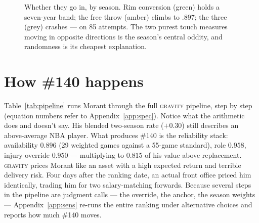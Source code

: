 \documentclass[11pt]{article}
\newcommand{\gravity}{\textsc{gravity}}
\begin{document}
\begin{figure}[h]
\centering
{}
\caption{Whether they go in, by season. Rim conversion (green) holds a seven-year band;
the free throw (amber) climbs to .897; the three (grey) crashes --- on 85 attempts. The two
purest touch measures moving in opposite directions is the season's central oddity, and
randomness is its cheapest explanation.}
\label{fig:acc}
\end{figure}

\section{How \#140 happens}
\label{sec:value}

Table~\ref{tab:pipeline} runs Morant through the full \gravity{} pipeline, step by step
(equation numbers refer to Appendix~\ref{app:spec}). Notice what the arithmetic does and
doesn't say. His blended two-season rate ($+0.30$) still describes an above-average NBA
player. What produces \#140 is the reliability stack: availability $0.896$ (29 weighted
games against a 55-game standard), role $0.958$, injury override $0.950$ --- multiplying
to $0.815$ of his value above replacement. \gravity{} prices Morant like an asset with a
high expected return and terrible delivery risk. Four days after the ranking date, an
actual front office priced him identically, trading him for two salary-matching forwards.
Because several steps in the pipeline are judgment calls --- the override, the anchor,
the season weights --- Appendix~\ref{app:sens} re-runs the entire ranking under
alternative choices and reports how much \#140 moves.
\end{document}

